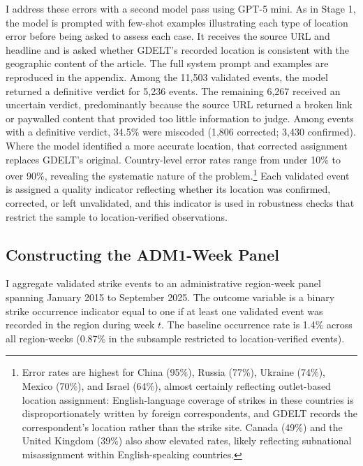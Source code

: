 \documentclass[
  11pt,
]{article}
\begin{document}
I address these errors with a second model pass using GPT-5 mini. As in
Stage 1, the model is prompted with few-shot examples illustrating each
type of location error before being asked to assess each case. It
receives the source URL and headline and is asked whether GDELT's
recorded location is consistent with the geographic content of the
article. The full system prompt and examples are reproduced in the
appendix. Among the 11,503 validated events, the model returned a
definitive verdict for 5,236 events. The remaining 6,267 received an
uncertain verdict, predominantly because the source URL returned a
broken link or paywalled content that provided too little information to
judge. Among events with a definitive verdict, 34.5\% were miscoded
(1,806 corrected; 3,430 confirmed). Where the model identified a more
accurate location, that corrected assignment replaces GDELT's original.
Country-level error rates range from under 10\% to over 90\%, revealing
the systematic nature of the problem.\footnote{Error rates are highest
  for China (95\%), Russia (77\%), Ukraine (74\%), Mexico (70\%), and
  Israel (64\%), almost certainly reflecting outlet-based location
  assignment: English-language coverage of strikes in these countries is
  disproportionately written by foreign correspondents, and GDELT
  records the correspondent's location rather than the strike site.
  Canada (49\%) and the United Kingdom (39\%) also show elevated rates,
  likely reflecting subnational misassignment within English-speaking
  countries.} Each validated event is assigned a quality indicator
reflecting whether its location was confirmed, corrected, or left
unvalidated, and this indicator is used in robustness checks that
restrict the sample to location-verified observations.

\subsection{Constructing the ADM1-Week
Panel}\label{constructing-the-adm1-week-panel}

I aggregate validated strike events to an administrative region-week
panel spanning January 2015 to September 2025. The outcome variable is a
binary strike occurrence indicator equal to one if at least one
validated event was recorded in the region during week \(t\). The
baseline occurrence rate is 1.4\% across all region-weeks (0.87\% in the
subsample restricted to location-verified events).
\end{document}
